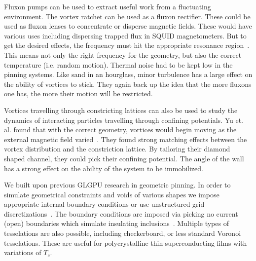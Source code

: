 Fluxon pumps can be used to extract useful work from a fluctuating environment. The vortex ratchet can be used as a fluxon rectifier. These could be used as fluxon lenses to concentrate or disperse magnetic fields. These would have various uses including dispersing trapped flux in SQUID magnetometers. But to get the desired effects, the frequency must hit the appropriate resonance region~\cite{Wambaugh99}. This means not only the right frequency for the geometry, but also the correct temperature (i.e. random motion). Thermal noise had to be kept low in the pinning systems. Like sand in an hourglass, minor turbulence has a large effect on the ability of vortices to stick. They again back up the idea that the more fluxons one has, the more their motion will be restricted.

Vortices travelling through constricting lattices can also be used to study the dynamics of interacting particles travelling through confining potentials. Yu et. al. found that with the correct geometry, vortices would begin moving as the external magnetic field varied~\cite{Yu10}. They found strong matching effects between the vortex distribution and the constriction lattice. By tailoring their diamond shaped channel, they could pick their confining potential. The angle of the wall has a strong effect on the ability of the system to be immobilized.

We built upon previous GLGPU research in geometric pinning. In order to simulate geometrical constraints and voids of various shapes we impose appropriate internal boundary conditions or use unstructured grid discretizations~\cite{Kwok16}. The boundary conditions are imposed via picking no current (open) boundaries which simulate insulating inclusions~\cite{Sadovskyy14}. Multiple types of tesselations are also possible, including checkerboard, or less standard Voronoi tesselations. These are useful for polycrystalline thin superconducting films with variations of $T_c$.


